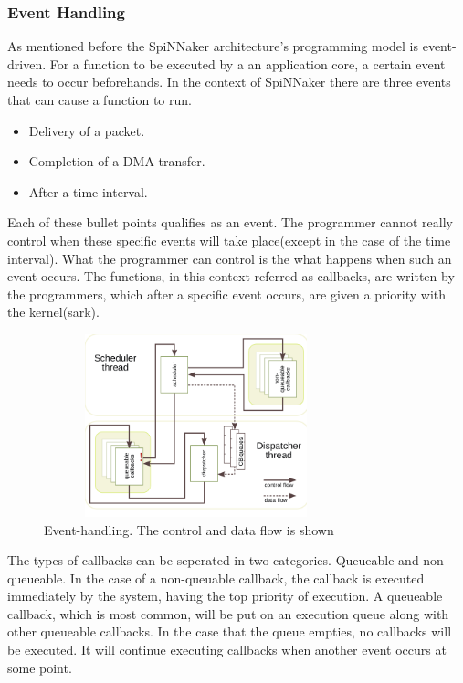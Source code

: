 \documentclass[12pt,a4paper]{article}
\begin{document}
\subsubsection{Event Handling}
As mentioned before the SpiNNaker architecture's programming model is event-driven. For a function to be executed by a an application core, a certain event needs to occur beforehands. In the context of SpiNNaker there are three events that can cause a function to run.
\begin{itemize}
\item Delivery of a packet.
\item Completion of a DMA transfer.
\item After a time interval.
\end{itemize}
Each of these bullet points qualifies as an event. The programmer cannot really control when these specific events will take place(except in the case of the time interval). What the programmer can control is the what happens when such an event occurs. The functions, in this context referred as callbacks, are written by the programmers, which after a specific event occurs, are given a priority with the kernel(sark). 
\begin{figure}[h!]
\includegraphics[width=250pt,height=150pt,scale=2]{Pics/event-handling.png}
\centering
\caption{Event-handling. The control and data flow is shown\cite{sharp2011event}}
\end{figure}
The types of callbacks can be seperated in two categories. Queueable and non-queueable. In the case of a non-queuable callback, the callback is executed immediately by the system, having the top priority of execution. A queueable callback, which is most common, will be put on an execution queue along with other queueable callbacks. In the case that the queue empties, no callbacks will be executed. It will continue executing callbacks when another event occurs at some point\cite{sharp2011event}\cite{rast2012managing}. 
	
\end{document}
